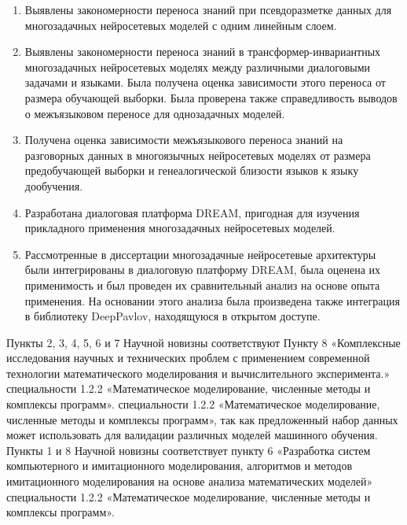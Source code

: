 {\novelty}
\begin{enumerate}
  \item {Выявлены закономерности переноса знаний при псевдоразметке данных для многозадачных нейросетевых моделей с одним линейным слоем.}
  \item {Выявлены закономерности переноса знаний в трансформер-инвариантных многозадачных нейросетевых моделях между различными диалоговыми задачами и языками. Была получена оценка зависимости этого переноса от размера обучающей выборки. Была проверена также справедливость выводов о межъязыковом переносе для однозадачных моделей.}
  \item {Получена оценка зависимости межъязыкового переноса знаний на разговорных данных в многоязычных нейросетевых моделях от размера предобучающей выборки и генеалогической близости языков к языку дообучения.}
  \item {Разработана диалоговая платформа DREAM, пригодная для изучения прикладного применения многозадачных нейросетевых моделей.}
  \item {Рассмотренные в диссертации многозадачные нейросетевые архитектуры были интегрированы в диалоговую платформу DREAM, была оценена их применимость и был проведен их сравнительный анализ на основе опыта применения. На основании этого анализа была произведена также интеграция в библиотеку DeepPavlov, находящуюся в открытом доступе.}
\end{enumerate}

{\appropriation}
Пункты 2, 3, 4, 5, 6 и 7 Научной новизны соответствуют Пункту 8 «Комплексные исследования научных и технических проблем с применением современной технологии математического моделирования и вычислительного эксперимента.» специальности 1.2.2 «Математическое моделирование, численные методы и комплексы программ». специальности 1.2.2 «Математическое моделирование, численные методы и комплексы программ», так как предложенный набор данных может использовать для валидации различных моделей машинного обучения. Пункты 1 и 8 Научной новизны соответствует пункту 6 «Разработка систем компьютерного и имитационного моделирования, алгоритмов и методов имитационного моделирования на основе анализа математических моделей» специальности 1.2.2 «Математическое моделирование, численные методы и комплексы программ». %

